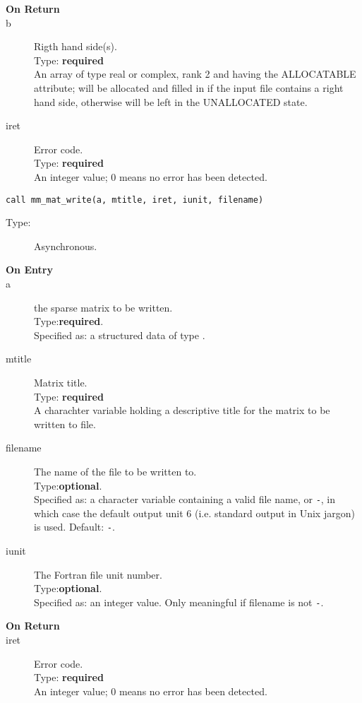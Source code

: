 \begin{description}
\item[\bf On Return]
\item[b] Rigth hand side(s).\\
Type: {\bf required} \\
An  array of type real or complex, rank 2 and having the ALLOCATABLE
attribute; will be allocated and filled in if the input file contains
a right hand side, otherwise will be left in the UNALLOCATED state. 
\item[iret] Error code.\\
Type: {\bf required} \\
An integer value; 0 means no error has been detected. 
\end{description}



\clearpage{}
\begin{lstlisting}
call mm_mat_write(a, mtitle, iret, iunit, filename)
\end{lstlisting}
\begin{description}
\item[Type:] Asynchronous.
\item[\bf  On Entry ]
\item[a] the sparse matrix to be written.\\
Type:{\bf required}.\\
Specified as: a structured data of type \spdata.
\item[mtitle] Matrix title.\\
Type: {\bf required} \\
A charachter variable holding a descriptive title for the matrix to be
 written to file.
\item[filename] The name of the file to be written to.\\
Type:{\bf optional}.\\
Specified as: a character variable containing a valid file name, or
\verb|-|, in which case the default output unit  6 (i.e. standard output
in Unix jargon) is used. Default: \verb|-|. 
\item[iunit] The Fortran file unit number.\\
Type:{\bf optional}.\\
Specified as: an integer value. Only meaningful if filename is not \verb|-|.
\end{description}

\begin{description}
\item[\bf On Return]
\item[iret] Error code.\\
Type: {\bf required} \\
An integer value; 0 means no error has been detected. 
\end{description}



